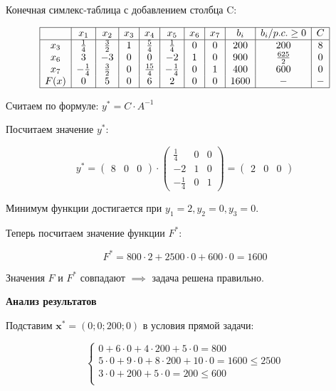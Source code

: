 \documentclass{article}
\begin{document}
Конечная симлекс-таблица с добавлением столбца C:

\[
    \begin{array}{|c|c|c|c|c|c|c|c|c|c|c|}
        \hline
             & x_1          & x_2         & x_3 & x_4          & x_5          & x_6 & x_7 & b_i  & b_i/p.c. \geq 0 & C \\
        \hline
        x_3  & \frac{1}{4}  & \frac{3}{2} & 1   & \frac{5}{4}  & \frac{1}{4}  & 0   & 0   & 200  & 200             & 8 \\
        x_6  & 3            & -3          & 0   & 0            & -2           & 1   & 0   & 900  & \frac{625}{2}   & 0 \\
        x_7  & -\frac{1}{4} & \frac{3}{2} & 0   & \frac{15}{4} & -\frac{1}{4} & 0   & 1   & 400  & 600             & 0 \\
        F(x) & 0            & 5           & 0   & 6            & 2            & 0   & 0   & 1600 & -               & - \\
        \hline
    \end{array}
\]

Считаем по формуле: \(y^* = C \cdot A^{-1}\)

Посчитаем значение \(y^*\):

\[
    y^* =\begin{pmatrix} 8 & 0 & 0 \end{pmatrix} \cdot \begin{pmatrix}
        \frac{1}{4}  & 0 & 0 \\
        -2           & 1 & 0 \\
        -\frac{1}{4} & 0 & 1
    \end{pmatrix} = \begin{pmatrix} 2 & 0 & 0 \end{pmatrix}
\]

Минимум функции достигается при \(y_1 = 2, y_2 = 0, y_3 = 0\).

Теперь посчитаем значение функции \(F^*\):

\[
    F^* = 800 \cdot 2 + 2500 \cdot 0 + 600 \cdot 0 = 1600
\]

Значения \(F \text{ и } F^*\) совпадают \(\implies\) задача решена правильно.

\textbf{Анализ результатов}

Подставим $ \mathbf{x^*} = \left(0; 0; 200; 0\right)$ в условия прямой задачи:

\[
    \begin{cases}
        0 + 6 \cdot 0 + 4 \cdot 200 + 5 \cdot 0 = 800                     \\
        5 \cdot 0 + 9 \cdot 0 + 8 \cdot 200 + 10 \cdot 0 = 1600 \leq 2500 \\
        3 \cdot 0 + 200 + 5 \cdot 0 = 200 \leq 600                        \\
    \end{cases}
\]
\end{document}
